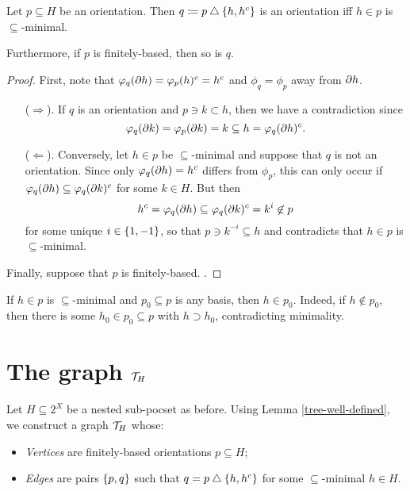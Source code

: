 \documentclass{amsart}
\begin{document}
    \begin{lemma}\label{tree-well-defined}
        Let $p\subseteq H$ be an orientation. Then $q\coloneqq p\bigtriangleup\left\{h,h^c\right\}$ is an orientation iff $h\in p$ is $\subseteq$-minimal.

        Furthermore, if $p$ is finitely-based, then so is $q$.
    \end{lemma}
    \begin{proof}
        First, note that $\varphi_q(\partial h)=\varphi_p(h)^c=h^c$ and $\phi_q=\phi_p$ away from $\partial h$.
        \begin{itemize}
            \item[($\Rightarrow$).] If $q$ is an orientation and $p\ni k\subset h$, then we have a contradiction since
                \begin{equation*}
                    \varphi_q(\partial k)=\varphi_p(\partial k)=k\subseteq h=\varphi_q(\partial h)^c.
                \end{equation*}
            \item[($\Leftarrow$).]Conversely, let $h\in p$ be $\subseteq$-minimal and suppose that $q$ is not an orientation. Since only $\varphi_q(\partial h)=h^c$ differs from $\phi_p$, this can only occur if $\varphi_q(\partial h)\subseteq\varphi_q(\partial k)^c$ for some $k\in H$. But then
                \begin{equation*}
                    h^c=\varphi_q(\partial h)\subseteq\varphi_q(\partial k)^c=k^i\not\in p
                \end{equation*}
                for some unique $i\in\left\{1,-1\right\}$, so that $p\ni k^{-i}\subseteq h$ and contradicts that $h\in p$ is $\subseteq$-minimal.
        \end{itemize}
        Finally, suppose that $p$ is finitely-based. {\color{red}{???}}.
    \end{proof}

    \begin{remark}
        If $h\in p$ is $\subseteq$-minimal and $p_0\subseteq p$ is any basis, then $h\in p_0$. Indeed, if $h\not\in p_0$, then there is some $h_0\in p_0\subseteq p$ with $h\supset h_0$, contradicting minimality.
    \end{remark}

    \section{The graph $\mathcal{T}_H$}

    Let $H\subseteq2^X$ be a nested sub-pocset as before. Using Lemma \ref{tree-well-defined}, we construct a graph $\mathcal{T}_H$ whose:
    \begin{itemize}
        \item \textit{Vertices} are finitely-based orientations $p\subseteq H$;
        \item \textit{Edges} are pairs $\left\{p,q\right\}$ such that $q=p\bigtriangleup\left\{h,h^c\right\}$ for some $\subseteq$-minimal $h\in H$.
    \end{itemize}
\end{document}
